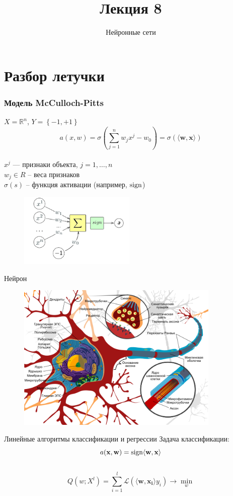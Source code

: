 \documentclass[10pt]{beamer}
\title{Лекция 8}
\subtitle{Нейронные сети}
\begin{document}
	

\section{Разбор летучки}

\frame{\titlepage}

\begin{frame}\frametitle{Модель McCulloch-Pitts}
  $X = \mathbb{R}^n$, ${Y = \left\{ -1, + 1\right\}}$\\
	\pause
	$$a(x,w) = \sigma(\sum\limits_{j=1}^n w_j x^j - w_0) = \sigma(\langle \mathbf{w}, \mathbf{x} \rangle)$$\\
  $x^j$ — признаки объекта, $j = 1,\dots, n$ \\	
	$w_j \in R$ -- веса признаков\\
	$\sigma(s)$ -- функция активации (например, $\operatorname{sign}$)
	\pause
	\begin{figure}[htbp]
	  \includegraphics[height=100pt, keepaspectratio = true]{images/neuron-scheme}   
	\end{figure}
\end{frame}

\begin{frame}{Нейрон}
	\begin{figure}[htbp]
	  \includegraphics[height=200pt, keepaspectratio = true]{images/neuron}   
	\end{figure}
\end{frame}

\begin{frame}{Линейные алгоритмы классификации и регрессии}
	Задача классификации: \\
	$$a(\mathbf{x},\mathbf{w}) = \operatorname{sign} \langle \mathbf{w}, \mathbf{x} \rangle $$\\
	\bigbreak
	\bigbreak
	$$Q(w;X^l) = \sum\limits_{i=1}^l \mathcal{L} (\langle \mathbf{w}, \mathbf{x_i}\rangle y_i) \rightarrow \min\limits_w$$\\
\end{frame}
\end{document}
